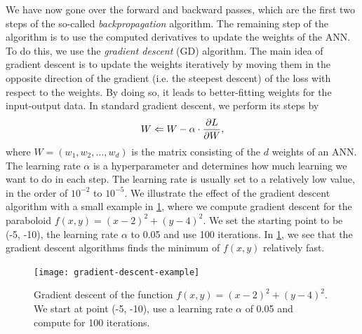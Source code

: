 We have now gone over the forward and backward passes, which are the first two steps of the so-called \textit{backpropagation} algorithm. The remaining step of the algorithm is to use the computed derivatives to update the weights of the ANN. To do this, we use the \textit{gradient descent} (GD) algorithm. The main idea of gradient descent is to update the weights iteratively by moving them in the opposite direction of the gradient (i.e. the steepest descent) of the loss with respect to the weights. By doing so, it leads to better-fitting weights for the input-output data. In standard gradient descent, we perform its steps by
\begin{align}
    W \Leftarrow W - \alpha \cdot \frac{\partial L}{\partial W},
\end{align}
where $W = \left( w_1, w_2, \ldots, w_d \right)$ is the matrix consisting of the $d$ weights of an ANN. The learning rate $\alpha$ is a hyperparameter and determines how much learning we want to do in each step. The learning rate is usually set to a relatively low value, in the order of $10^{-2}$ to $10^{-5}$. We illustrate the effect of the gradient descent algorithm with a small example in \cref{fig:gradient-descent-example}, where we compute gradient descent for the paraboloid $f(x, y) = (x - 2)^2 + (y - 4)^2$. We set the starting point to be (-5, -10), the learning rate $\alpha$ to 0.05 and use 100 iterations. In \cref{fig:gradient-descent-example}, we see that the gradient descent algorithms finds the minimum of $f(x, y)$ relatively fast.
\begin{figure}[H]
    \centering
    \texttt{[image: gradient-descent-example]}
    \caption{Gradient descent of the function $f(x, y) = (x - 2)^2 + (y - 4)^2$. We start at point (-5, -10), use a learning rate $\alpha$ of 0.05 and compute for 100 iterations.}
    \label{fig:gradient-descent-example}
\end{figure}

